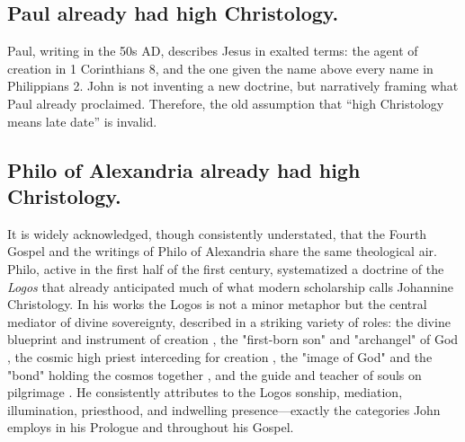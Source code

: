 \subsection{Paul already had high Christology.}\label{subsec:paul-already-had-high-christology.}

Paul, writing in the 50s AD, describes Jesus in exalted terms: the agent of creation in 1 Corinthians 8, and the one given the name above every name in Philippians 2.
John is not inventing a new doctrine, but narratively framing what Paul already proclaimed.
Therefore, the old assumption that “high Christology means late date” is invalid.

\subsection{Philo of Alexandria already had high Christology.}\label{subsec:philo-of-alexandria-already-had-high-christology.}

It is widely acknowledged, though consistently understated, that the Fourth Gospel and the writings of Philo of Alexandria share the same theological air.
Philo, active in the first half of the first century, systematized a doctrine of the \emph{Logos} that already anticipated much of what modern scholarship calls Johannine Christology.
In his works the Logos is not a minor metaphor but the central mediator of divine sovereignty, described in a striking variety of roles:
the divine blueprint and instrument of creation \cite[20, 146]{philo:opificio},
the "first-born son" and "archangel" of God \cite[146--147]{philo:confusione},
the cosmic high priest interceding for creation \cite[1.81; 4.123--125]{philo:specleg},
the "image of God" and the "bond" holding the cosmos together \cite[1.215--239]{philo:somniis} \cite[35--36]{philo:cherubim},
and the guide and teacher of souls on pilgrimage \cite[6]{philo:migratione}.
He consistently attributes to the Logos sonship, mediation, illumination, priesthood, and indwelling presence---exactly the categories John employs in his Prologue and throughout his Gospel.

